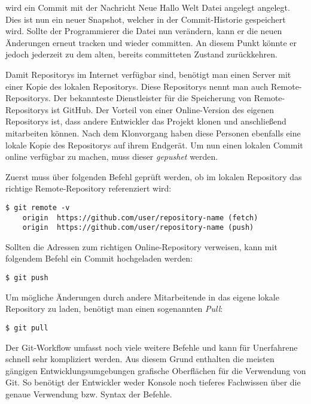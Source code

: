 wird ein Commit mit der Nachricht \glqq Neue Hallo Welt Datei angelegt\grqq{}
angelegt. Dies ist nun ein neuer Snapshot, welcher in der Commit-Historie
gespeichert wird. Sollte der Programmierer die Datei nun verändern, kann er die
neuen Änderungen erneut tracken und wieder committen. An diesem Punkt könnte er
jedoch jederzeit zu dem alten, bereits committeten Zustand zurückkehren.

Damit Repositorys im Internet verfügbar sind, benötigt man einen Server mit
einer Kopie des lokalen Repositorys. Diese Repositorys nennt man auch
Remote-Repositorys. Der bekannteste Dienstleister für die Speicherung
von Remote-Repositorys ist GitHub. Der Vorteil von einer Online-Version des
eigenen Repositorys ist, dass andere Entwickler das Projekt klonen und
anschließend mitarbeiten können. Nach dem Klonvorgang haben diese Personen
ebenfalls eine lokale Kopie des Repositorys auf ihrem Endgerät. Um nun einen
lokalen Commit online verfügbar zu machen, muss dieser \emph{gepushet} werden.

Zuerst muss über folgenden Befehl geprüft werden, ob im lokalen Repository das
richtige Remote-Repository referenziert wird:

\begin{lstlisting}[style=Bash]
    $ git remote -v
    origin	https://github.com/user/repository-name (fetch)
    origin	https://github.com/user/repository-name (push)
\end{lstlisting}

Sollten die Adressen zum richtigen Online-Repository verweisen, kann mit
folgendem Befehl ein Commit hochgeladen werden:

\begin{lstlisting}[style=Bash]
    $ git push
\end{lstlisting}

Um mögliche Änderungen durch andere Mitarbeitende in das eigene lokale
Repository zu laden, benötigt man einen sogenannten \emph{Pull}:

\begin{lstlisting}[style=Bash]
    $ git pull
\end{lstlisting}

Der Git-Workflow umfasst noch viele weitere Befehle und kann für Unerfahrene
schnell sehr kompliziert werden. Aus diesem Grund enthalten die meisten gängigen
Entwicklungsumgebungen grafische Oberflächen für die Verwendung von Git. So
benötigt der Entwickler weder Konsole noch tieferes Fachwissen über die genaue
Verwendung bzw. Syntax der Befehle.

